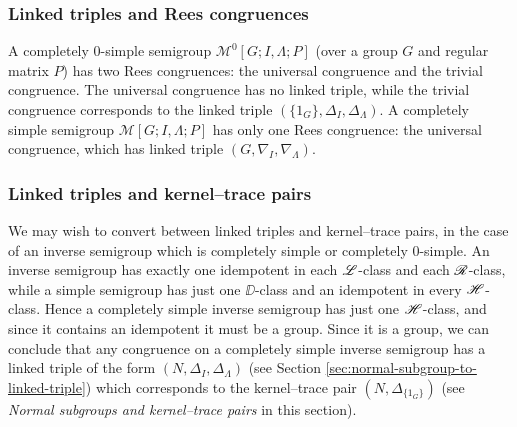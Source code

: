 \subsubsection{Linked triples and Rees congruences}
A completely 0-simple semigroup $\mathcal{M}^0[G;I,\Lambda;P]$ (over a group $G$
and regular matrix $P$) has two Rees
congruences: the universal congruence and the trivial congruence.  The universal
congruence has no linked triple, while the trivial congruence corresponds to the
linked triple $(\{1_G\}, \Delta_I, \Delta_\Lambda)$.  A completely simple
semigroup $\mathcal{M}[G;I,\Lambda;P]$ has only one Rees congruence: the
universal congruence, which has linked triple $(G, \nabla_I, \nabla_\Lambda)$.

\subsubsection{Linked triples and kernel--trace pairs}
We may wish to convert between linked triples and kernel--trace pairs, in the
case of an inverse semigroup which is completely simple or completely 0-simple.
An inverse semigroup has exactly one idempotent in each $\mathrel{\mathscr{L}}$-class and each
$\mathrel{\mathscr{R}}$-class, while a simple semigroup has just one $\DD$-class and an idempotent
in every $\mathrel{\mathscr{H}}$-class.  Hence a completely simple inverse semigroup has just one
$\mathrel{\mathscr{H}}$-class, and since it contains an idempotent it must be a group.  Since it
is a group, we can conclude that any congruence on a completely simple inverse
semigroup has a linked triple of the form $(N, \Delta_I, \Delta_\Lambda)$ (see
Section \ref{sec:normal-subgroup-to-linked-triple}) which corresponds to the
kernel--trace pair $(N, \Delta_{\{1_G\}})$ (see \textit{Normal subgroups and
  kernel--trace pairs} in this section).

